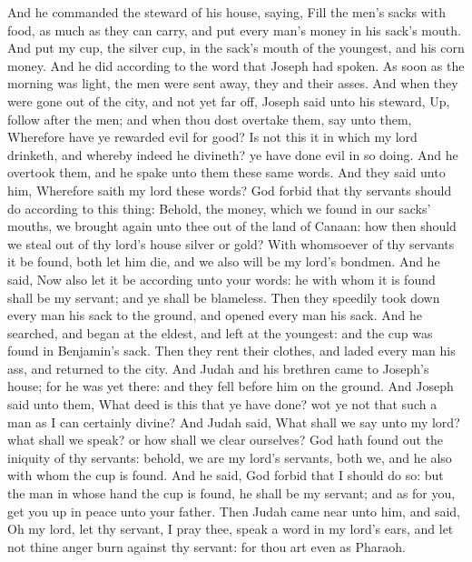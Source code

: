\begin{biblechapter} %
 And he commanded the steward of his house, saying, Fill the men's sacks with food, as much as they can carry, and put every man's money in his sack's mouth.
\verse And put my cup, the silver cup, in the sack's mouth of the youngest, and his corn money. And he did according to the word that Joseph had spoken.
\verse As soon as the morning was light, the men were sent away, they and their asses.
\verse And when they were gone out of the city, and not yet far off, Joseph said unto his steward, Up, follow after the men; and when thou dost overtake them, say unto them, Wherefore have ye rewarded evil for good?
\verse Is not this it in which my lord drinketh, and whereby indeed he divineth? ye have done evil in so doing.
\verse And he overtook them, and he spake unto them these same words.
\verse And they said unto him, Wherefore saith my lord these words? God forbid that thy servants should do according to this thing:
\verse Behold, the money, which we found in our sacks' mouths, we brought again unto thee out of the land of Canaan: how then should we steal out of thy lord's house silver or gold?
\verse With whomsoever of thy servants it be found, both let him die, and we also will be my lord's bondmen.
\verse And he said, Now also let it be according unto your words: he with whom it is found shall be my servant; and ye shall be blameless.
\verse Then they speedily took down every man his sack to the ground, and opened every man his sack.
\verse And he searched, and began at the eldest, and left at the youngest: and the cup was found in Benjamin's sack.
\verse Then they rent their clothes, and laded every man his ass, and returned to the city.
\verse And Judah and his brethren came to Joseph's house; for he was yet there: and they fell before him on the ground.
\verse And Joseph said unto them, What deed is this that ye have done? wot ye not that such a man as I can certainly divine?
\verse And Judah said, What shall we say unto my lord? what shall we speak? or how shall we clear ourselves? God hath found out the iniquity of thy servants: behold, we are my lord's servants, both we, and he also with whom the cup is found.
\verse And he said, God forbid that I should do so: but the man in whose hand the cup is found, he shall be my servant; and as for you, get you up in peace unto your father.
\verse Then Judah came near unto him, and said, Oh my lord, let thy servant, I pray thee, speak a word in my lord's ears, and let not thine anger burn against thy servant: for thou art even as Pharaoh.

\end{biblechapter}
